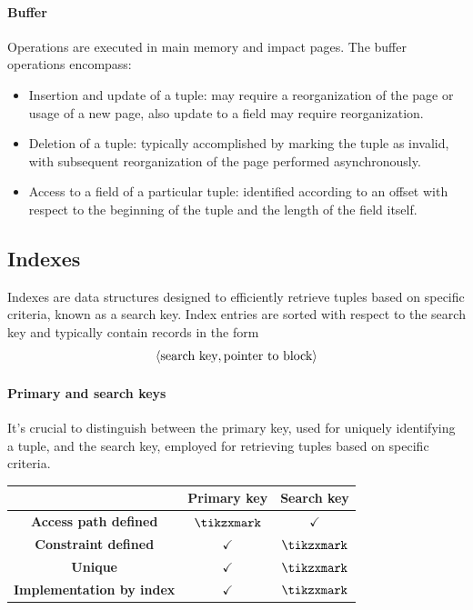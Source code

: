 \paragraph*{Buffer}
Operations are executed in main memory and impact pages.
The buffer operations encompass:
\begin{itemize}
    \item Insertion and update of a tuple: may require a reorganization of the page or usage of a new page, also update to a field may require reorganization.
    \item Deletion of a tuple: typically accomplished by marking the tuple as invalid, with subsequent reorganization of the page performed asynchronously.
    \item Access to a field of a particular tuple: identified according to an offset with respect to the beginning of the tuple and the length of the field itself.
\end{itemize}

\subsection{Indexes}
Indexes are data structures designed to efficiently retrieve tuples based on specific criteria, known as a search key.
Index entries are sorted with respect to the search key and typically contain records in the form 
\[\left\langle \textnormal{search key}, \textnormal{pointer to block}\right\rangle \]

\paragraph*{Primary and search keys}
It's crucial to distinguish between the primary key, used for uniquely identifying a tuple, and the search key, employed for retrieving tuples based on specific criteria.
\begin{table}[H]
    \centering
    \begin{tabular}{c|cc|}
    \cline{2-3}
                                                           & \textbf{Primary key} & \textbf{Search key} \\ \hline
    \multicolumn{1}{|c|}{\textbf{Access path defined}}     & $\tikzxmark$         & $\checkmark$        \\
    \multicolumn{1}{|c|}{\textbf{Constraint defined}}      & $\checkmark$         & $\tikzxmark$        \\
    \multicolumn{1}{|c|}{\textbf{Unique}}                  & $\checkmark$         & $\tikzxmark$        \\
    \multicolumn{1}{|c|}{\textbf{Implementation by index}} & $\checkmark$         & $\tikzxmark$        \\ \hline
    \end{tabular}
\end{table}

